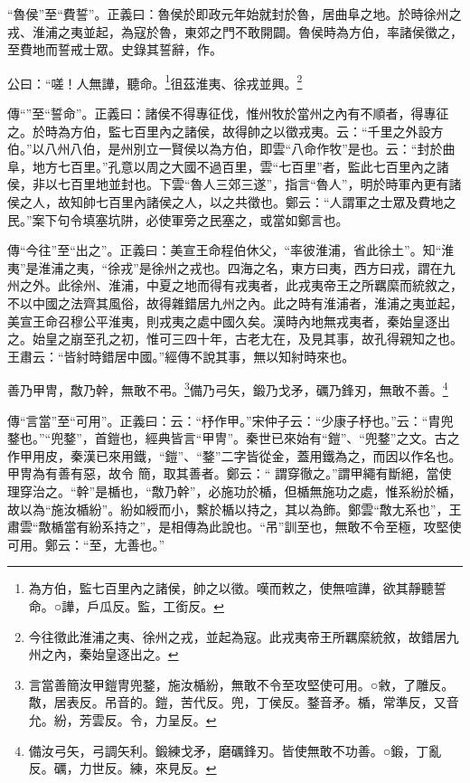 {\noindent\shu{}\fzkt “魯侯”至“費誓”。正義曰：魯侯於即政元年始就封於魯，居曲阜之地。於時徐州之戎、淮浦之夷並起，為寇於魯，東郊之門不敢開闢。魯侯時為方伯，率諸侯徵之，至費地而誓戒士眾。史錄其誓辭，作。 \par}

公曰：“嗟！人無譁，聽命。\footnote{為方伯，監七百里內之諸侯，帥之以徵。嘆而敕之，使無喧譁，欲其靜聽誓命。○譁，戶瓜反。監，工銜反。}徂茲淮夷、徐戎並興。\footnote{今往徵此淮浦之夷、徐州之戎，並起為寇。此戎夷帝王所羈縻統敘，故錯居九州之內，秦始皇逐出之。}


{\noindent\zhuan{}\fzbyks 傳“”至“誓命”。正義曰：諸侯不得專征伐，惟州牧於當州之內有不順者，得專征之。於時為方伯，監七百里內之諸侯，故得帥之以徵戎夷。云：“千里之外設方伯。”以八州八伯，是州別立一賢侯以為方伯，即雲“八命作牧”是也。云：“封於曲阜，地方七百里。”孔意以周之大國不過百里，雲“七百里”者，監此七百里內之諸侯，非以七百里地並封也。下雲“魯人三郊三遂”，指言“魯人”，明於時軍內更有諸侯之人，故知帥七百里內諸侯之人，以之共徵也。鄭云：“人謂軍之士眾及費地之民。”案下句令填塞坑阱，必使軍旁之民塞之，或當如鄭言也。 \par}

{\noindent\zhuan{}\fzbyks 傳“今往”至“出之”。正義曰：美宣王命程伯休父，“率彼淮浦，省此徐土”。知“淮夷”是淮浦之夷，“徐戎”是徐州之戎也。四海之名，東方曰夷，西方曰戎，謂在九州之外。此徐州、淮浦，中夏之地而得有戎夷者，此戎夷帝王之所羈縻而統敘之，不以中國之法齊其風俗，故得雜錯居九州之內。此之時有淮浦者，淮浦之夷並起，美宣王命召穆公平淮夷，則戎夷之處中國久矣。漢時內地無戎夷者，秦始皇逐出之。始皇之崩至孔之初，惟可三四十年，古老尢在，及見其事，故孔得親知之也。王肅云：“皆紂時錯居中國。”經傳不說其事，無以知紂時來也。 \par}

善乃甲冑，敿乃幹，無敢不弔。\footnote{言當善簡汝甲鎧冑兜鍪，施汝楯紛，無敢不令至攻堅使可用。○敹，了雕反。敿，居表反。吊音的。鎧，苦代反。兜，丁侯反。鍪音矛。楯，常準反，又音允。紛，芳雲反。令，力呈反。}備乃弓矢，鍛乃戈矛，礪乃鋒刃，無敢不善。\footnote{備汝弓矢，弓調矢利。鍛練戈矛，磨礪鋒刃。皆使無敢不功善。○鍛，丁亂反。礪，力世反。練，來見反。}

{\noindent\zhuan{}\fzbyks 傳“言當”至“可用”。正義曰：云：“杼作甲。”宋仲子云：“少康子杼也。”云：“胄兜鍪也。”“兜鍪”，首鎧也，經典皆言“甲冑”。秦世已來始有“鎧”、“兜鍪”之文。古之作甲用皮，秦漢已來用鐵，“鎧”、“鍪”二字皆從金，蓋用鐵為之，而因以作名也。甲冑為有善有惡，故令 簡，取其善者。鄭云：“ 謂穿徹之。”謂甲繩有斷絕，當使 理穿治之。“幹”是楯也，“敿乃幹”，必施功於楯，但楯無施功之處，惟系紛於楯，故以為“施汝楯紛”。紛如綬而小，繫於楯以持之，其以為飾。鄭雲“敿尢系也”，王肅雲“敿楯當有紛系持之”，是相傳為此說也。“吊”訓至也，無敢不令至極，攻堅使可用。鄭云：“至，尢善也。” \par}

